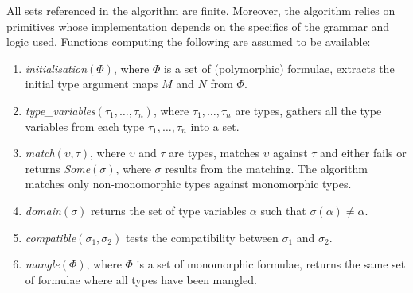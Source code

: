\documentclass[runningheads]{llncs}
\begin{document}
All sets referenced in the algorithm are %
finite. Moreover, the algorithm relies on primitives whose implementation depends on the specifics of the grammar and logic used. %
Functions computing the following are assumed to be available: 
\begin{enumerate}
   \item[\labelitemi] \emph{initialisation\((\Phi)\)}, where \(\Phi\) is a set of (polymorphic) formulae, extracts the initial type argument maps \(M\) and \(N\) from \(\Phi\).
   \item[\labelitemi] \emph{type\_variables\((\tau_1, \dots, \tau_n)\)}, where \(\tau_1, \dots,\tau_n\) are types, gathers all the type variables from each type \(\tau_1, \dots, \tau_n\) into a set.
   \item[\labelitemi] \emph{match\((\upsilon, \tau)\)}, where \(\upsilon\) and \(\tau\) are types, matches \(\upsilon\) against \(\tau\) and either fails or returns \emph{Some\((\sigma)\)}, where \(\sigma\) results from the matching. The algorithm matches only non-monomorphic types against monomorphic types.
   \item[\labelitemi] \emph{domain\((\sigma)\)} %
   returns the set of type variables \(\alpha\) such that \(\sigma(
   \alpha) \not= \alpha\).
   \item[\labelitemi] \emph{compatible\((\sigma_1, \sigma_2)\)} %
   tests the compatibility between \(\sigma_1\) and \(\sigma_2\).
   \item[\labelitemi] \emph{mangle\((\Phi)\)}, where \(\Phi\) is a set of monomorphic formulae, returns the same set of formulae where all types have been mangled.
\end{enumerate}
\end{document}
